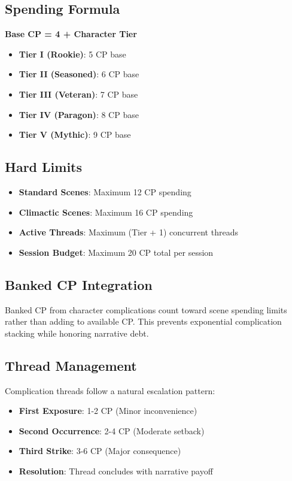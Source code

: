 \documentclass[11pt]{article}
\begin{document}
\subsection{Spending Formula}
\textbf{Base CP = 4 + Character Tier}
\begin{itemize}
    \item \textbf{Tier I (Rookie)}: 5 CP base
    \item \textbf{Tier II (Seasoned)}: 6 CP base
    \item \textbf{Tier III (Veteran)}: 7 CP base
    \item \textbf{Tier IV (Paragon)}: 8 CP base
    \item \textbf{Tier V (Mythic)}: 9 CP base
\end{itemize}

\subsection{Hard Limits}
\begin{itemize}
    \item \textbf{Standard Scenes}: Maximum 12 CP spending
    \item \textbf{Climactic Scenes}: Maximum 16 CP spending
    \item \textbf{Active Threads}: Maximum (Tier + 1) concurrent threads
    \item \textbf{Session Budget}: Maximum 20 CP total per session
\end{itemize}

\subsection{Banked CP Integration}
Banked CP from character complications count toward scene spending limits rather than adding to available CP. This prevents exponential complication stacking while honoring narrative debt.

\subsection{Thread Management}
Complication threads follow a natural escalation pattern:
\begin{itemize}
    \item \textbf{First Exposure}: 1-2 CP (Minor inconvenience)
    \item \textbf{Second Occurrence}: 2-4 CP (Moderate setback)
    \item \textbf{Third Strike}: 3-6 CP (Major consequence)
    \item \textbf{Resolution}: Thread concludes with narrative payoff
\end{itemize}
\end{document}

